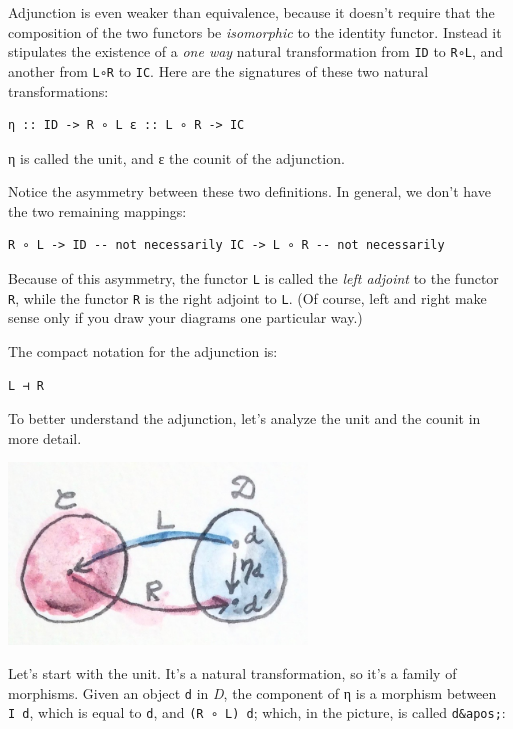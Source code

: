 Adjunction is even weaker than equivalence, because it doesn't require
that the composition of the two functors be \emph{isomorphic} to the
identity functor. Instead it stipulates the existence of a \emph{one
way} natural transformation from \texttt{ID} to \texttt{R∘L}, and
another from \texttt{L∘R} to \texttt{IC}. Here are the signatures of
these two natural transformations:

\begin{verbatim}
η :: ID -> R ∘ L ε :: L ∘ R -> IC
\end{verbatim}

η is called the unit, and ε the counit of the adjunction.

Notice the asymmetry between these two definitions. In general, we don't
have the two remaining mappings:

\begin{verbatim}
R ∘ L -> ID -- not necessarily IC -> L ∘ R -- not necessarily
\end{verbatim}

Because of this asymmetry, the functor \texttt{L} is called the
\emph{left adjoint} to the functor \texttt{R}, while the functor
\texttt{R} is the right adjoint to \texttt{L}. (Of course, left and
right make sense only if you draw your diagrams one particular way.)

The compact notation for the adjunction is:

\begin{verbatim}
L ⊣ R
\end{verbatim}

To better understand the adjunction, let's analyze the unit and the
counit in more detail.

\includegraphics[width=3.12500in]{images/adj-unit.jpg}

Let's start with the unit. It's a natural transformation, so it's a
family of morphisms. Given an object \texttt{d} in \emph{D}, the
component of η is a morphism between \texttt{I\ d}, which is equal to
\texttt{d}, and \texttt{(R\ ∘\ L)\ d}; which, in the picture, is called
\texttt{d\&apos;}:

